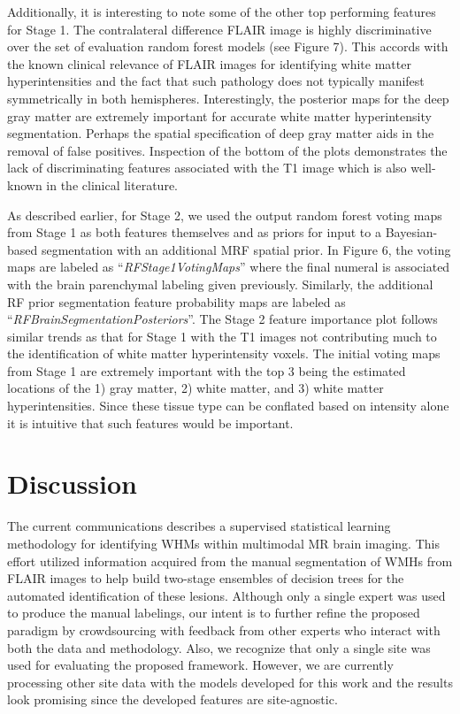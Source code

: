 \documentclass[11pt,]{article}
\begin{document}
Additionally, it is interesting to note some of the other top performing
features for Stage 1. The contralateral difference FLAIR image is highly
discriminative over the set of evaluation random forest models (see
Figure 7). This accords with the known clinical relevance of FLAIR
images for identifying white matter hyperintensities and the fact that
such pathology does not typically manifest symmetrically in both
hemispheres. Interestingly, the posterior maps for the deep gray matter
are extremely important for accurate white matter hyperintensity
segmentation. Perhaps the spatial specification of deep gray matter aids
in the removal of false positives. Inspection of the bottom of the plots
demonstrates the lack of discriminating features associated with the T1
image which is also well-known in the clinical literature.

As described earlier, for Stage 2, we used the output random forest
voting maps from Stage 1 as both features themselves and as priors for
input to a Bayesian-based segmentation with an additional MRF spatial
prior. In Figure 6, the voting maps are labeled as
``\emph{RFStage1VotingMaps}'' where the final numeral is associated with
the brain parenchymal labeling given previously. Similarly, the
additional RF prior segmentation feature probability maps are labeled as
``\emph{RFBrainSegmentationPosteriors}''. The Stage 2 feature importance
plot follows similar trends as that for Stage 1 with the T1 images not
contributing much to the identification of white matter hyperintensity
voxels. The initial voting maps from Stage 1 are extremely important
with the top 3 being the estimated locations of the 1) gray matter, 2)
white matter, and 3) white matter hyperintensities. Since these tissue
type can be conflated based on intensity alone it is intuitive that such
features would be important.

\section{Discussion}\label{discussion}

The current communications describes a supervised statistical learning
methodology for identifying WHMs within multimodal MR brain imaging.
This effort utilized information acquired from the manual segmentation
of WMHs from FLAIR images to help build two-stage ensembles of decision
trees for the automated identification of these lesions. Although only a
single expert was used to produce the manual labelings, our intent is to
further refine the proposed paradigm by crowdsourcing with feedback from
other experts who interact with both the data and methodology. Also, we
recognize that only a single site was used for evaluating the proposed
framework. However, we are currently processing other site data with the
models developed for this work and the results look promising since the
developed features are site-agnostic.
\end{document}

